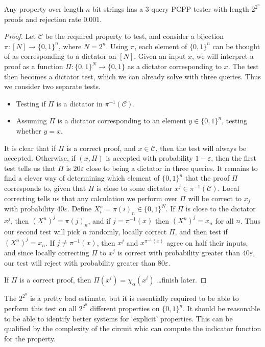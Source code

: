 \begin{theorem}
    Any property over length $n$ bit strings has a 3-query PCPP tester with length-$2^{2^n}$ proofs and rejection rate $0.001$.
\end{theorem}
\begin{proof}
    Let $\mathcal{C}$ be the required property to test, and consider a bijection $\pi: [N] \to \{ 0, 1 \}^n$, where $N = 2^n$. Using $\pi$, each element of $\{ 0, 1 \}^n$ can be thought of as corresponding to a dictator on $[N]$. Given an input $x$, we will interpret a proof as a function $\Pi: \{ 0, 1 \}^N \to \{ 0, 1 \}$ as a dictator corresponding to $x$. The test then becomes a dictator test, which we can already solve with three queries. Thus we consider two separate tests.
    \begin{itemize}
        \item Testing if $\Pi$ is a dictator in $\pi^{-1}(\mathcal{C})$.
        \item Assuming $\Pi$ is a dictator corresponding to an element $y \in \{ 0, 1 \}^n$, testing whether $y = x$.
    \end{itemize}
    It is clear that if $\Pi$ is a correct proof, and $x \in \mathcal{C}$, then the test will always be accepted. Otherwise, if $(x,\Pi)$ is accepted with probability $1 - \varepsilon$, then the first test tells us that $\Pi$ is $20 \varepsilon$ close to being a dictator in three queries. It remains to find a clever way of determining which element of $\{ 0, 1 \}^n$ that the proof $\Pi$ corresponds to, given that $\Pi$ is close to some dictator $x^j \in \pi^{-1}(\mathcal{C})$. Local correcting tells us that any calculation we perform over $\Pi$ will be correct to $x_j$ with probability $40 \varepsilon$. Define $X^n_i = \pi(i)_n \in \{ 0,1\}^N$. If $\Pi$ is close to the dictator $x^j$, then $(X^n)^j = \pi(j)_n$, and if $j = \pi^{-1}(x)$ then $(X^n)^j = x_n$ for all $n$. Thus our second test will pick $n$ randomly, locally correct $\Pi$, and then test if $(X^n)^j = x_n$. If $j \neq \pi^{-1}(x)$, then $x^j$ and $x^{\pi^{-1}(x)}$ agree on half their inputs, and since locally correcting $\Pi$ to $x^j$ is correct with probability greater than $40 \varepsilon$, our test will reject with probability greater than $80 \varepsilon$.

    If $\Pi$ is a correct proof, then $\Pi(x^i) = \chi_\alpha(x^i)$ \dots finish later.
\end{proof}

The $2^{2^n}$ is a pretty bad estimate, but it is essentially required to be able to perform this test on all $2^{2^n}$ different properties on $\{ 0, 1 \}^n$. It should be reasonable to be able to identify better systems for `explicit' properties. This can be qualified by the complexity of the circuit whic can compute the indicator function for the property.

